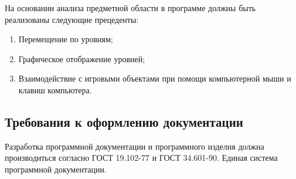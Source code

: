 На основании анализа предметной области в программе должны быть реализованы следующие прецеденты:
\begin{enumerate}
	\item Перемещение по уровням;
	\item Графическое отображение уровней;
	\item Взаимодействие с игровыми объектами при помощи компьютерной мыши и клавиш компьютера.
\end{enumerate}

\subsection{Требования к оформлению документации}

Разработка программной документации и программного изделия должна производиться согласно ГОСТ 19.102-77 и ГОСТ 34.601-90. Единая система программной документации.
